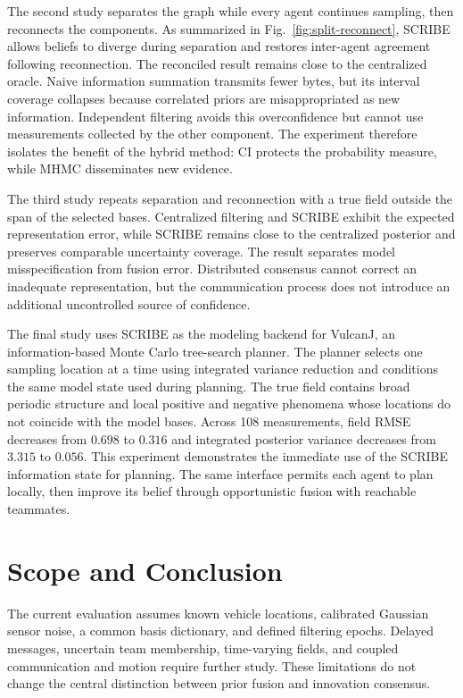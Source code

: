 \documentclass[letterpaper,10pt,conference]{ieeeconf}
\begin{document}
The second study separates the graph while every agent continues sampling,
then reconnects the components. As summarized in
Fig.~\ref{fig:split-reconnect}, SCRIBE allows beliefs to diverge during
separation and restores inter-agent agreement following reconnection. The
reconciled result remains close to the centralized oracle. Naive information
summation transmits fewer bytes, but its interval coverage collapses because
correlated priors are misappropriated as new information. Independent
filtering avoids this overconfidence but cannot use measurements collected by
the other component. The experiment therefore isolates the benefit of the
hybrid method: CI protects the probability measure, while MHMC disseminates
new evidence.

The third study repeats separation and reconnection with a true field outside
the span of the selected bases. Centralized filtering and SCRIBE exhibit the
expected representation error, while SCRIBE remains close to the centralized
posterior and preserves comparable uncertainty coverage. The result separates
model misspecification from fusion error. Distributed consensus cannot correct
an inadequate representation, but the communication process does not
introduce an additional uncontrolled source of confidence.

The final study uses SCRIBE as the modeling backend for VulcanJ, an
information-based Monte Carlo tree-search planner. The planner selects one
sampling location at a time using integrated variance reduction and
conditions the same model state used during planning. The true field contains
broad periodic structure and local positive and negative phenomena whose
locations do not coincide with the model bases. Across 108 measurements,
field RMSE decreases from $0.698$ to $0.316$ and integrated posterior variance
decreases from $3.315$ to $0.056$. This experiment demonstrates the immediate
use of the SCRIBE information state for planning. The same interface permits
each agent to plan locally, then improve its belief through opportunistic
fusion with reachable teammates.

\section{Scope and Conclusion}

The current evaluation assumes known vehicle locations, calibrated Gaussian
sensor noise, a common basis dictionary, and defined filtering epochs.
Delayed messages, uncertain team membership, time-varying fields, and coupled
communication and motion require further study. These limitations do not
change the central distinction between prior fusion and innovation consensus.
\end{document}
